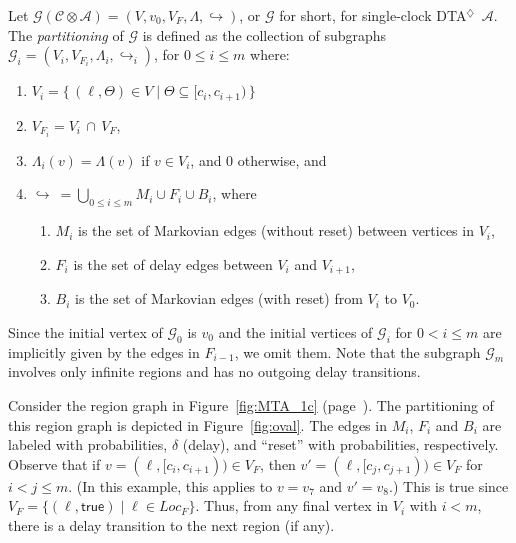 \documentclass{LMCS}
\newcommand{\mc}[1]{\mathcal{#1}}
\newcommand{\<}{\langle}
\renewcommand{\>}{\rangle}
\newcommand{\les}{\leqslant}
\newcommand{\mG}{\mathcal{G}}
\newcommand{\mC}{\mathcal{C}}
\newcommand{\mA}{\mathcal{A}}
\newcommand{\DTA}{\textsc{DTA}}
\newcommand{\DTAr}{\DTA$^{\!\Ever}$}
\newcommand{\F}{\mathop{\diamondsuit}}
\newcommand{\Ever}{\F}
\begin{document}
\begin{defi}
Let $\mc{G}(\mC \otimes \mA) = (V, v_0, V_F, \Lambda, \hookrightarrow)$,
or $\mc{G}$ for short, for single-clock \DTAr\ $\mA$.
The \emph{partitioning} of $\mc{G}$ is defined as the collection of subgraphs
$\mc{G}_i = (V_i, {V_{F_i}}, \Lambda_i, \hookrightarrow_i)$, for $0 \les
i \les m$ where:
\begin{enumerate}[$\bullet$]
\item $V_i = \{ \, (\ell,\Theta) \in V \mid \Theta\subseteq [c_i,c_{i{+}1}) \, \}$
\item $V_{F_i} = V_i \, \cap \, V_F$,
\item $\Lambda_i(v) = \Lambda(v)$ if $v\in V_i$, and 0 otherwise, and
\item $\hookrightarrow \ = \displaystyle \bigcup_{0\les i\les m } M_i\cup F_i\cup
 B_i$, where
\begin{enumerate}[$-$]
\item
$M_i$ is the set of Markovian edges (without reset) between vertices in $V_i$,
\item
$F_i$ is the set of delay edges between $V_i$ and $V_{i{+}1}$,
\item
$B_i$ is the set of Markovian edges (with reset) from $V_i$ to $V_0$.
\end{enumerate}
\end{enumerate}
\end{defi}
Since the initial vertex of $\mG_0$ is $v_0$ and the initial vertices of $\mG_i$ for
$0< i \les m$ are implicitly given by the edges in $F_{i{-}1}$, we omit them.  Note
that the subgraph $\mG_m$ involves only infinite regions and has no outgoing
delay transitions.
\begin{exa}
Consider the region graph in Figure~\ref{fig:MTA_1c} (page~\pageref{fig:MTA_1c}).
The partitioning of this region graph is depicted in Figure~\ref{fig:oval}.
The edges in $M_i$, $F_i$ and $B_i$ are labeled with probabilities, $\delta$ (delay),
and ``reset'' with probabilities, respectively.
Observe that if $v = (\ell, [c_i,c_{i+1})) \in V_F$, then $v' = (\ell, [c_j,c_{j+1})) \in V_F$
for $i < j \les m$.
(In this example, this applies to $v = v_7$ and $v' = v_8$.)
This is true since $V_F = \{(\ell,\mathsf{true})\mid \ell\in Loc_F\}$.
Thus, from any final vertex in $V_i$ with $i < m$, there is a delay transition to the
next region (if any).
\end{exa}
\end{document}
